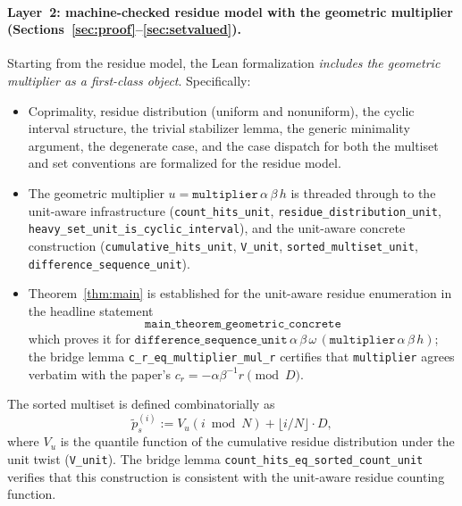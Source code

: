 \documentclass[11pt,reqno]{amsart}
\theoremstyle{plain}
\theoremstyle{definition}
\theoremstyle{remark}
\begin{document}
\paragraph{Layer~2: machine-checked residue model with the geometric
multiplier (Sections~\ref{sec:proof}--\ref{sec:setvalued}).} Starting
from the residue model, the Lean formalization \emph{includes the
geometric multiplier as a first-class object}.  Specifically:

\begin{itemize}
    \item Coprimality, residue distribution (uniform and nonuniform), the
          cyclic interval structure, the trivial stabilizer lemma, the
          generic minimality argument, the degenerate case, and the case
          dispatch for both the multiset and set conventions are formalized
          for the residue model.
    \item The geometric multiplier \(u = \texttt{multiplier}\,\alpha\,\beta\,h\)
          is threaded through to the unit-aware infrastructure
          (\texttt{count\_\allowbreak hits\_\allowbreak unit},
          \texttt{residue\_\allowbreak distribution\_\allowbreak unit},
          \texttt{heavy\_\allowbreak set\_\allowbreak unit\_\allowbreak is\_\allowbreak cyclic\_\allowbreak interval}),
          and the unit-aware concrete construction
          (\texttt{cumulative\_\allowbreak hits\_\allowbreak unit},
          \texttt{V\_\allowbreak unit},
          \texttt{sorted\_\allowbreak multiset\_\allowbreak unit},
          \texttt{difference\_\allowbreak sequence\_\allowbreak unit}).
    \item Theorem~\ref{thm:main} is established for the unit-aware
          residue enumeration in the headline statement
          \[
              \texttt{main\_theorem\_geometric\_concrete}
          \]
          which proves it for
          \(\texttt{difference\_sequence\_unit}\,\alpha\,\beta\,\omega\,
          (\texttt{multiplier}\,\alpha\,\beta\,h)\); the bridge lemma
          \texttt{c\_r\_eq\_multiplier\_mul\_r} certifies that
          \texttt{multiplier} agrees verbatim with the paper's
          \(c_r = -\alpha\beta^{-1}r \pmod{D}\).
\end{itemize}

The sorted multiset is defined combinatorially as
\[
    \tilde{p}^{(i)}_s := V_u(i \bmod N) + \lfloor i/N \rfloor \cdot D,
\]
where \(V_u\) is the quantile function of the cumulative residue
distribution under the unit twist (\texttt{V\_unit}).  The bridge lemma
\texttt{count\_hits\_eq\_sorted\_count\_unit} verifies that this
construction is consistent with the unit-aware residue counting function.
\end{document}
